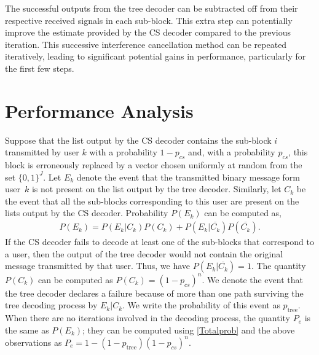 \documentclass{article}
\begin{document}
\begin{remark}
\label{rmk:iterations}
The successful outputs from the tree decoder can be subtracted off from their respective received signals in each sub-block.
This extra step can potentially improve the estimate provided by the CS decoder compared to the previous iteration.
This successive interference cancellation method can be repeated iteratively, leading to significant potential gains in performance, particularly for the first few steps.
\end{remark}

\section{Performance Analysis}%
\label{perr}
Suppose that the list output by the CS decoder contains the sub-block $i$ transmitted by user $k$ with a probability $1-p_{cs}$ and, with a probability $p_{cs}$, this block is erroneously replaced by a vector chosen uniformly at random from the set $\{0,1\}^{J}$.
Let $E_k$ denote the event that the transmitted binary message form user~$k$ is not present on the list output by the tree decoder.
Similarly, let $C_k$ be the event that all the sub-blocks corresponding to this user are present on the lists output by the CS decoder.
Probability $P(E_k)$ can be computed as,
\begin{align}
P(E_k) = P(E_k\lvert C_k)P(C_k) + P(E_k\lvert \overline{C_k})P(\overline{C_k}).  \label{Totalprob}
\end{align}
If the CS decoder fails to decode at least one of the sub-blocks that correspond to a user, then the output of the tree decoder would not contain the original message transmitted by that user.
Thus, we have $P(E_k \lvert \overline{C_k})=1$.
The quantity $P(C_k)$ can be computed as $P(C_k)=(1-p_{cs})^n$.
We denote the event that the tree decoder declares a failure because of more than one path surviving the tree decoding process by $E_k\lvert C_k$.
We write the probability of this event as $p_{\mathrm{tree}}$.
When there are no iterations involved in the decoding process, the quantity $P_e$ is the same as $P(E_k)$; they can be computed using \eqref{Totalprob} and the above observations as $P_e = 1-(1-p_{\mathrm{tree}})(1-p_{cs})^n$.
\end{document}
